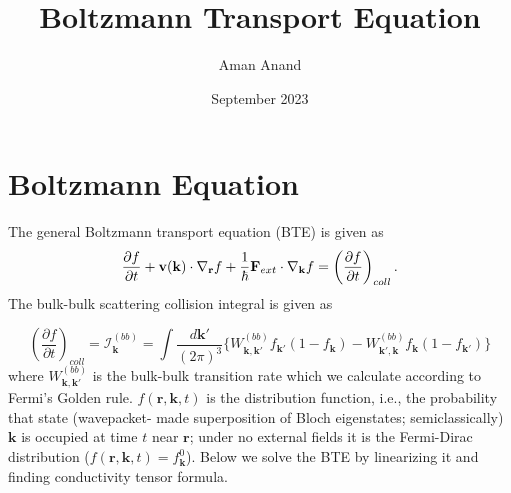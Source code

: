 \documentclass{article}
\title{Boltzmann Transport Equation}
\author{Aman Anand}
\date{September 2023}
\begin{document}
	
	\maketitle
	
\section{Boltzmann Equation}\label{App:Boltzmann}
The general Boltzmann transport equation (BTE) is given as
\begin{eqnarray}
	\frac{\partial f}{\partial t}+ {\bf v}({\bf k}) \cdot \nabla_{\bf r}f+\frac{1}{\hbar}{\bf F}_{ext} \cdot \nabla_{\bf k}f = \left( \frac{\partial f}{\partial t}\right)_{coll}.
\end{eqnarray}
The bulk-bulk scattering collision integral is given as

\begin{equation}
	\left(\frac{\partial f}{\partial t}\right)_{coll} = \mathcal{I}_{\mathbf{k}}^{(bb)} = \int \frac{d\mathbf{k'}}{(2\pi)^3} \{W_{\mathbf{k},\mathbf{k'}}^{(bb)}f_{\mathbf{k'}}(1-f_{\mathbf{k}})-W_{\mathbf{k'},\mathbf{k}}^{(bb)}f_{\mathbf{k}}(1-f_{\mathbf{k'}}) \}
\end{equation}
where $W_{\mathbf{k},\mathbf{k'}}^{(bb)}$ is the bulk-bulk transition rate which we calculate according to  Fermi's Golden rule. $f(\mathbf{r}, \mathbf{k},t)$ is the distribution function, i.e., the probability that state (wavepacket- made superposition of Bloch eigenstates; semiclassically)  $\mathbf{k}$ is occupied at time $t$ near $\mathbf{r}$; under no external fields it is the Fermi-Dirac distribution ($f(\mathbf{r}, \mathbf{k},t) = f_{\mathbf{k}} ^0$). Below we solve the BTE by linearizing it and finding conductivity tensor formula.
\end{document}
